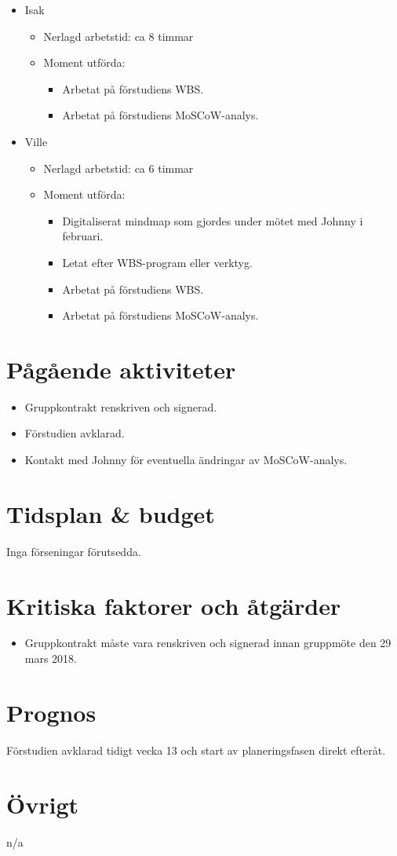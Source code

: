 \begin{itemize}[noitemsep]
\begin{itemize}[noitemsep]
    \end{itemize}
    \item Isak
    \begin{itemize}[noitemsep]
        \item Nerlagd arbetstid: ca 8 timmar
        \item Moment utförda:
        \begin{itemize}[noitemsep]
            \item Arbetat på förstudiens WBS.
            \item Arbetat på förstudiens MoSCoW-analys.
        \end{itemize}
    \end{itemize}
    \item Ville
    \begin{itemize}[noitemsep]
        \item Nerlagd arbetstid: ca 6 timmar
        \item Moment utförda:
        \begin{itemize}[noitemsep]
            \item Digitaliserat mindmap som gjordes under mötet med Johnny i februari.
            \item Letat efter WBS-program eller verktyg.
            \item Arbetat på förstudiens WBS.
            \item Arbetat på förstudiens MoSCoW-analys.
        \end{itemize}
    \end{itemize}
\end{itemize}

\section{Pågående aktiviteter}
\begin{itemize}[noitemsep]
    \item Gruppkontrakt renskriven och signerad.
    \item Förstudien avklarad.
    \item Kontakt med Johnny för eventuella ändringar av MoSCoW-analys.
\end{itemize}

\section{Tidsplan \& budget}
Inga förseningar förutsedda.

\section{Kritiska faktorer och åtgärder}
\begin{itemize}
    \item Gruppkontrakt måste vara renskriven och signerad innan gruppmöte den 29 mars 2018.
\end{itemize}

\section{Prognos}
Förstudien avklarad tidigt vecka 13 och start av planeringsfasen direkt efteråt.

\section{Övrigt}
n/a
